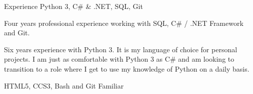\begin{cventries}
  \cventry
    {Experience}
    {Python 3, C\# \& .NET, SQL, Git}
    {}
    {}
    {
      \begin{cvitems}
		  \item Four years professional experience working with SQL, C\# / .NET Framework and Git.
		  \item Six years experience with Python 3. It is my language of choice for personal projects. I am just as comfortable with Python 3 as C\# and am looking to transition to a role where I get to use my knowledge of Python on a daily basis.
      \end{cvitems}
    }
  \cventry
    {HTML5, CCS3, Bash and Git}
    {Familiar}
    {}
    {}
    {
      \begin{cvitems}
      \end{cvitems}
    }
\vspace*{-2pt}
\end{cventries}

